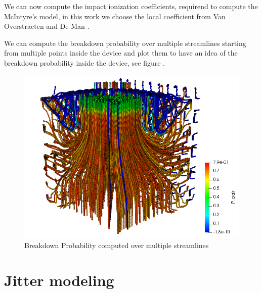 \documentclass[10pt,a4paper,twocolumn]{article}
\begin{document}
We can now compute the impact ionization coefficients, requirend to compute the McIntyre's model, in this work we choose the local coefficient from Van Overstraeten and De Man \cite{van_overstraeten_measurement_1970}.

We can compute the breakdown probability over multiple streamlines starting from multiple points inside the device and plot them to have an idea of the breakdown probability inside the device, see figure .

\begin{figure}[hbtp]
\caption{Breakdown Probability computed over multiple streamlines}
\centering
\includegraphics[scale=0.50]{../pictures/MultipleStreamlinesBrP.png}
\end{figure}


\section{Jitter modeling}
\end{document}
